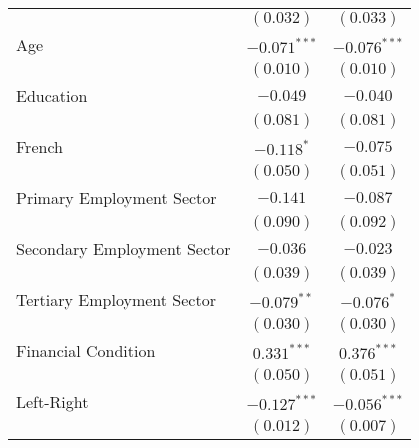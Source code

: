 \begin{center}
\begin{tiny}
\begin{longtable}{l@{} c@{} c@{}}
                                                                         & $(0.032)$        & $(0.033)$        \\
\quad Age                                                                & $-0.071^{***}$   & $-0.076^{***}$   \\
                                                                         & $(0.010)$        & $(0.010)$        \\
\quad Education                                                          & $-0.049$         & $-0.040$         \\
                                                                         & $(0.081)$        & $(0.081)$        \\
\quad French                                                             & $-0.118^{*}$     & $-0.075$         \\
                                                                         & $(0.050)$        & $(0.051)$        \\
\quad Primary Employment Sector                                          & $-0.141$         & $-0.087$         \\
                                                                         & $(0.090)$        & $(0.092)$        \\
\quad Secondary Employment Sector                                        & $-0.036$         & $-0.023$         \\
                                                                         & $(0.039)$        & $(0.039)$        \\
\quad Tertiary Employment Sector                                         & $-0.079^{**}$    & $-0.076^{*}$     \\
                                                                         & $(0.030)$        & $(0.030)$        \\
\quad Financial Condition                                                & $0.331^{***}$    & $0.376^{***}$    \\
                                                                         & $(0.050)$        & $(0.051)$        \\
\quad Left-Right                                                         & $-0.127^{***}$   & $-0.056^{***}$   \\
                                                                         & $(0.012)$        & $(0.007)$        \\

\end{longtable}
\end{tiny}
\end{center}
